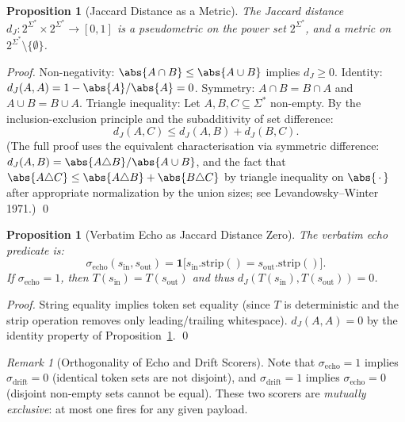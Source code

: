 \documentclass[11pt,letterpaper]{article}
\newtheorem{proposition}[theorem]{Proposition}
\theoremstyle{remark}
\newtheorem{remark}[theorem]{Remark}
\begin{document}
\begin{proposition}[Jaccard Distance as a Metric]
\label{prop:jaccard-metric}
The Jaccard distance $d_J: 2^{\Sigma^*} \times 2^{\Sigma^*} \to [0,1]$ is
a pseudometric on the power set $2^{\Sigma^*}$, and a metric on
$2^{\Sigma^*} \setminus \{\emptyset\}$.
\end{proposition}

\begin{proof}
Non-negativity: $\abs{A \cap B} \leq \abs{A \cup B}$ implies $d_J \geq 0$.
Identity: $d_J(A,A) = 1 - \abs{A}/\abs{A} = 0$.
Symmetry: $A \cap B = B \cap A$ and $A \cup B = B \cup A$.
Triangle inequality: Let $A, B, C \subseteq \Sigma^*$ non-empty.
By the inclusion-exclusion principle and the subadditivity of set difference:
\[
  d_J(A,C) \leq d_J(A,B) + d_J(B,C).
\]
(The full proof uses the equivalent characterisation via symmetric
difference: $d_J(A,B) = \abs{A \triangle B}/\abs{A \cup B}$, and
the fact that $\abs{A \triangle C} \leq \abs{A \triangle B} + \abs{B \triangle C}$
by triangle inequality on $\abs{\,\cdot\,}$ after appropriate normalization
by the union sizes; see Levandowsky--Winter 1971.) \qed
\end{proof}

\begin{proposition}[Verbatim Echo as Jaccard Distance Zero]
\label{prop:verbatim}
The \emph{verbatim echo} predicate is:
\[
  \sigma_{\text{echo}}(s_{\text{in}}, s_{\text{out}})
  = \mathbf{1}\bigl[s_{\text{in}}.\text{strip}()
    = s_{\text{out}}.\text{strip}()\bigr]. \tag{A17}
\]
If $\sigma_{\text{echo}} = 1$, then $T(s_{\text{in}}) = T(s_{\text{out}})$
and thus $d_J(T(s_{\text{in}}), T(s_{\text{out}})) = 0$.
\end{proposition}

\begin{proof}
String equality implies token set equality (since $T$ is deterministic
and the strip operation removes only leading/trailing whitespace).
$d_J(A,A) = 0$ by the identity property of Proposition~\ref{prop:jaccard-metric}.
\qed
\end{proof}

\begin{remark}[Orthogonality of Echo and Drift Scorers]
Note that $\sigma_{\text{echo}} = 1$ implies $\sigma_{\text{drift}} = 0$
(identical token sets are not disjoint), and $\sigma_{\text{drift}} = 1$
implies $\sigma_{\text{echo}} = 0$ (disjoint non-empty sets cannot be equal).
These two scorers are \emph{mutually exclusive}: at most one fires for any
given payload.
\end{remark}
\end{document}
